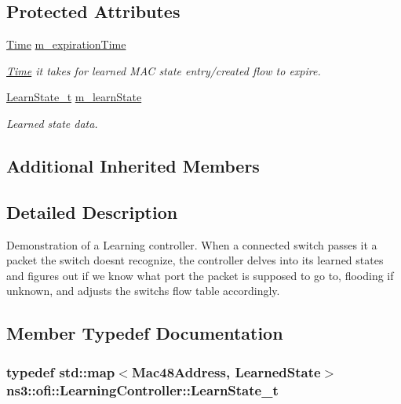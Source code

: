 \subsection*{Protected Attributes}
\begin{DoxyCompactItemize}
\item 
\hyperlink{classns3_1_1Time}{Time} \hyperlink{classns3_1_1ofi_1_1LearningController_aab075a2a3f2312ccd54199805a899499}{m\+\_\+expiration\+Time}
\begin{DoxyCompactList}\small\item\em \hyperlink{classns3_1_1Time}{Time} it takes for learned M\+AC state entry/created flow to expire. \end{DoxyCompactList}\item 
\hyperlink{classns3_1_1ofi_1_1LearningController_a86da4aa2ed2b125a6a93b3b06a404c3f}{Learn\+State\+\_\+t} \hyperlink{classns3_1_1ofi_1_1LearningController_aba8cc65c2c3be6a19f78f8467caeeb56}{m\+\_\+learn\+State}
\begin{DoxyCompactList}\small\item\em Learned state data. \end{DoxyCompactList}\end{DoxyCompactItemize}
\subsection*{Additional Inherited Members}


\subsection{Detailed Description}
Demonstration of a Learning controller. When a connected switch passes it a packet the switch doesn\textquotesingle{}t recognize, the controller delves into its learned states and figures out if we know what port the packet is supposed to go to, flooding if unknown, and adjusts the switch\textquotesingle{}s flow table accordingly. 

\subsection{Member Typedef Documentation}
\subsubsection[{\texorpdfstring{Learn\+State\+\_\+t}{LearnState_t}}]{\setlength{\rightskip}{0pt plus 5cm}typedef std\+::map$<${\bf Mac48\+Address}, {\bf Learned\+State}$>$ {\bf ns3\+::ofi\+::\+Learning\+Controller\+::\+Learn\+State\+\_\+t}\hspace{0.3cm}{\ttfamily [protected]}}\hypertarget{classns3_1_1ofi_1_1LearningController_a86da4aa2ed2b125a6a93b3b06a404c3f}{}\label{classns3_1_1ofi_1_1LearningController_a86da4aa2ed2b125a6a93b3b06a404c3f}


